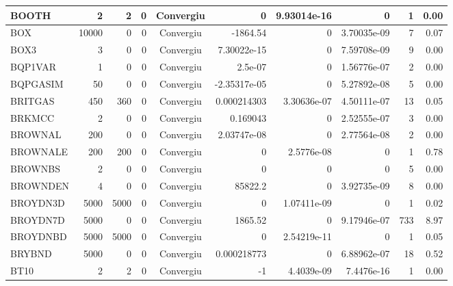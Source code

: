 \begin{center}
\begin{longtable}{|l|r|r|r|c|r|r|r|r|r|}
   BOOTH &      2 &      2 &      0 & Convergiu  &           0 &    9.93014e-16 &           0 &      1 &    0.00 \\ \hline
     BOX &  10000 &      0 &      0 & Convergiu  &    -1864.54 &              0 & 3.70035e-09 &      7 &    0.07 \\ \hline
    BOX3 &      3 &      0 &      0 & Convergiu  & 7.30022e-15 &              0 & 7.59708e-09 &      9 &    0.00 \\ \hline
 BQP1VAR &      1 &      0 &      0 & Convergiu  &     2.5e-07 &              0 & 1.56776e-07 &      2 &    0.00 \\ \hline
BQPGASIM &     50 &      0 &      0 & Convergiu  & -2.35317e-05 &              0 & 5.27892e-08 &      5 &    0.00 \\ \hline
 BRITGAS &    450 &    360 &      0 & Convergiu  & 0.000214303 &    3.30636e-07 & 4.50111e-07 &     13 &    0.05 \\ \hline
  BRKMCC &      2 &      0 &      0 & Convergiu  &    0.169043 &              0 & 2.52555e-07 &      3 &    0.00 \\ \hline
 BROWNAL &    200 &      0 &      0 & Convergiu  & 2.03747e-08 &              0 & 2.77564e-08 &      2 &    0.00 \\ \hline
BROWNALE &    200 &    200 &      0 & Convergiu  &           0 &     2.5776e-08 &           0 &      1 &    0.78 \\ \hline
 BROWNBS &      2 &      0 &      0 & Convergiu  &           0 &              0 &           0 &      5 &    0.00 \\ \hline
BROWNDEN &      4 &      0 &      0 & Convergiu  &     85822.2 &              0 & 3.92735e-09 &      8 &    0.00 \\ \hline
BROYDN3D &   5000 &   5000 &      0 & Convergiu  &           0 &    1.07411e-09 &           0 &      1 &    0.02 \\ \hline
BROYDN7D &   5000 &      0 &      0 & Convergiu  &     1865.52 &              0 & 9.17946e-07 &    733 &    8.97 \\ \hline
BROYDNBD &   5000 &   5000 &      0 & Convergiu  &           0 &    2.54219e-11 &           0 &      1 &    0.05 \\ \hline
  BRYBND &   5000 &      0 &      0 & Convergiu  & 0.000218773 &              0 & 6.88962e-07 &     18 &    0.52 \\ \hline
    BT10 &      2 &      2 &      0 & Convergiu  &          -1 &     4.4039e-09 &  7.4476e-16 &      1 &    0.00 \\ \hline

\end{longtable}
\end{center}
